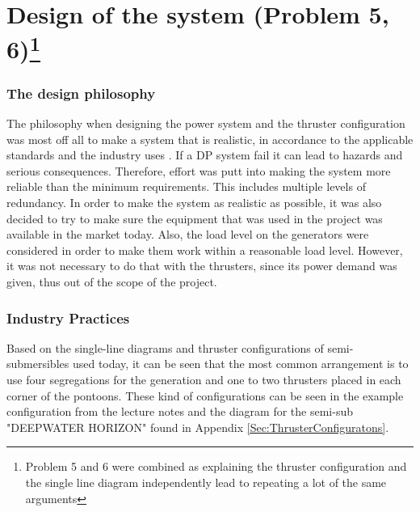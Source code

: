 \newpage
\section*{Design of the system (Problem 5, 6)\footnote{Problem 5 and 6 were combined as explaining the thruster configuration and the single line diagram independently lead to repeating a lot of the same arguments}} \label{prob_5and6}


 \subsubsection*{The design philosophy}\label{Sec:designPhilosophy}
The philosophy when designing the power system and the thruster configuration was most off all to make a system that is realistic, in accordance to the applicable standards and the industry uses . If a DP system fail it can lead to hazards and serious consequences. Therefore, effort was putt into making the system more reliable than the minimum requirements. This includes multiple levels of redundancy. In order to make the system as realistic as possible, it was also decided to try to make sure the equipment that was used in the project was available in the market today. Also, the load level on the generators were considered in order to make them work within a reasonable load level. However, it was not necessary to do that with the thrusters, since its power demand was given, thus out of the scope of the project. 


\subsubsection*{Industry Practices} \label{Sec:industryPractices}
Based on the single-line diagrams and thruster configurations of semi-submersibles used today, it can be seen that the most common arrangement is to use four segregations for the generation and one to two thrusters placed in each corner of the pontoons. These kind of configurations can be seen in the example configuration from the lecture notes and the diagram for the semi-sub "DEEPWATER HORIZON" found in Appendix \ref{Sec:ThrusterConfiguratons}.  

